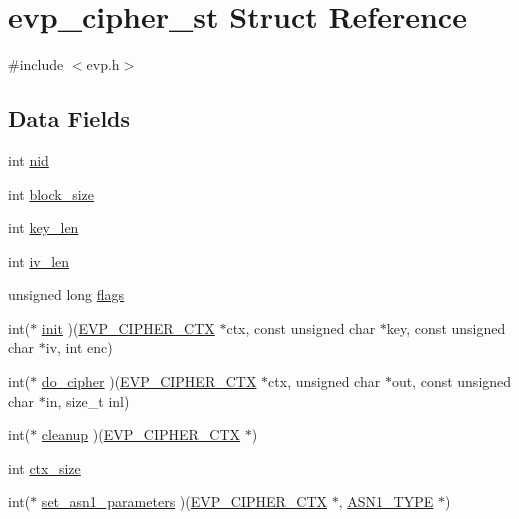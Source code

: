 \hypertarget{structevp__cipher__st}{}\section{evp\+\_\+cipher\+\_\+st Struct Reference}
\label{structevp__cipher__st}


{\ttfamily \#include $<$evp.\+h$>$}

\subsection*{Data Fields}
\begin{DoxyCompactItemize}
\item 
int \hyperlink{structevp__cipher__st_a7235ef62e89328f5155846dc59c6fc37}{nid}
\item 
int \hyperlink{structevp__cipher__st_a70b27761c7d0bd5cd90f4fe47e569b94}{block\+\_\+size}
\item 
int \hyperlink{structevp__cipher__st_a7d361be539db0a416204f2af38248d08}{key\+\_\+len}
\item 
int \hyperlink{structevp__cipher__st_a9a20dd55d0e03d26c39118b61042d5c5}{iv\+\_\+len}
\item 
unsigned long \hyperlink{structevp__cipher__st_a9e339c2784bd040b26a5112866700bff}{flags}
\item 
int($\ast$ \hyperlink{structevp__cipher__st_a20083d7d9fea622956f909275f06e955}{init} )(\hyperlink{crypto_2ossl__typ_8h_aab2bd6a044e1d31ebc2fe82b3b0b3d9a}{E\+V\+P\+\_\+\+C\+I\+P\+H\+E\+R\+\_\+\+C\+TX} $\ast$ctx, const unsigned char $\ast$key, const unsigned char $\ast$iv, int enc)
\item 
int($\ast$ \hyperlink{structevp__cipher__st_a8f0316220cf8f3aa0ef47e6bb9baa412}{do\+\_\+cipher} )(\hyperlink{crypto_2ossl__typ_8h_aab2bd6a044e1d31ebc2fe82b3b0b3d9a}{E\+V\+P\+\_\+\+C\+I\+P\+H\+E\+R\+\_\+\+C\+TX} $\ast$ctx, unsigned char $\ast$out, const unsigned char $\ast$in, size\+\_\+t inl)
\item 
int($\ast$ \hyperlink{structevp__cipher__st_a657ab7bf792951d6cfdca0647bdf69eb}{cleanup} )(\hyperlink{crypto_2ossl__typ_8h_aab2bd6a044e1d31ebc2fe82b3b0b3d9a}{E\+V\+P\+\_\+\+C\+I\+P\+H\+E\+R\+\_\+\+C\+TX} $\ast$)
\item 
int \hyperlink{structevp__cipher__st_a283e909780db477722c366b5e1425f7d}{ctx\+\_\+size}
\item 
int($\ast$ \hyperlink{structevp__cipher__st_a2f3b51b9c07a375d8407505a639dee6d}{set\+\_\+asn1\+\_\+parameters} )(\hyperlink{crypto_2ossl__typ_8h_aab2bd6a044e1d31ebc2fe82b3b0b3d9a}{E\+V\+P\+\_\+\+C\+I\+P\+H\+E\+R\+\_\+\+C\+TX} $\ast$, \hyperlink{crypto_2asn1_2asn1_8h_a7895e03d9fee2bc4963faf2a31a9439e}{A\+S\+N1\+\_\+\+T\+Y\+PE} $\ast$)

\end{DoxyCompactItemize}

